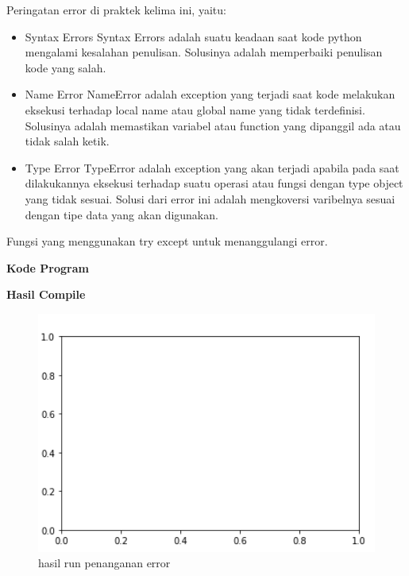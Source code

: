 		\hfill \break
		Peringatan error di praktek kelima ini, yaitu:
		\begin{itemize}
			\item Syntax Errors
			Syntax Errors adalah suatu keadaan saat kode python mengalami kesalahan penulisan. Solusinya adalah memperbaiki penulisan kode yang salah.
			
			\item Name Error
			NameError adalah exception yang terjadi saat kode melakukan eksekusi terhadap local name atau global name yang tidak terdefinisi. Solusinya adalah memastikan variabel atau function yang dipanggil ada atau tidak salah ketik.
			
			\item Type Error
			TypeError adalah exception yang akan terjadi apabila pada saat dilakukannya eksekusi terhadap suatu operasi atau fungsi dengan type object yang tidak sesuai. Solusi dari error ini adalah mengkoversi varibelnya sesuai dengan tipe data yang akan digunakan.
		\end{itemize}
		\hfill \break
		Fungsi yang menggunakan try except untuk menanggulangi error.

		\hfill \break
		\textbf{Kode Program}

		

		\hfill \break
		\textbf{Hasil Compile}

		\begin{figure}[H]
			\includegraphics[width=12cm]{figures/chapter6/1174057/error.png}
			\centering
			\caption{hasil run penanganan error}
		\end{figure}
		
